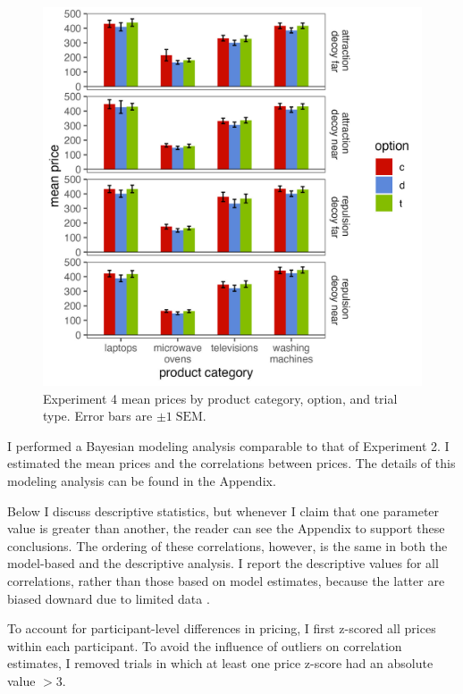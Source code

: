 \begin{figure}
    \includegraphics[width=200mm,scale=0.5]{figures/price_m_by_effect_category.jpeg}
    \caption{Experiment 4 mean prices by product category, option, and trial type. Error bars are $\pm 1\;\text{SEM}$.}
    \label{fig:price_m_by_effect_category}
\end{figure}

I performed a Bayesian modeling analysis comparable to that of Experiment 2. I estimated the mean prices and the correlations between prices. The details of this modeling analysis can be found in the Appendix. 

Below I discuss descriptive statistics, but whenever I claim that one parameter value is greater than another, the reader can see the Appendix to support these conclusions. The ordering of these correlations, however, is the same in both the model-based and the descriptive analysis. I report the descriptive values for all correlations, rather than those based on model estimates, because the latter are  biased downard due to limited data \parencite{stephens2020state,merkle2023opaque}. 

To account for participant-level differences in pricing, I first z-scored all prices within each participant. To avoid the influence of outliers on correlation estimates, I removed trials in which at least one price z-score had an absolute value $>3$. 

